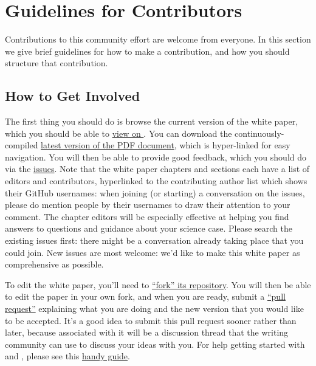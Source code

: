 \section{Guidelines for Contributors}
\def\secname{intro:guidelines}\label{sec:\secname}


Contributions to this community effort are welcome from everyone. In
this section we give brief guidelines for how to make a contribution,
and how you should structure that contribution.

\subsection{How to Get Involved}

The first thing you should do is browse the current version of the white
paper, which you should be able to \href{http://ls.st/iw2}{view on
\GitHub}. You can download the  continuously-compiled
\href{http://www.slac.stanford.edu/~digel/ObservingStrategy/whitepaper/LSST_Observing_Strategy_White_Paper.pdf}{latest
version of the PDF document}, which is hyper-linked for easy navigation.
You will then be able to provide good feedback, which you should do via
the
\href{https://github.com/LSSTScienceCollaborations/ObservingStrategy/issues}{\GitHub
issues}. Note that the white paper chapters and sections each have a
list of editors and contributors, hyperlinked to the contributing author
list which shows their GitHub usernames: when joining (or starting) a
conversation on the issues, please do {\@}mention people by
their usernames to draw their attention to your comment. The chapter
editors will be especially effective at helping you find answers to
questions and guidance about your science case. Please search the
existing issues first: there might be a
conversation already taking place that you could join. New issues are
most welcome: we'd like to make this white paper as comprehensive as
possible.

To edit the white paper, you'll need to
\href{https://help.github.com/articles/fork-a-repo/}{``fork'' its
repository}. You will then  be able to edit the paper in your own
fork, and when you are ready,  submit a
\href{https://help.github.com/articles/using-pull-requests/}{``pull
request''} explaining what you are doing and the new version that  you
would like to be accepted. It's a good idea to submit this pull
request sooner rather than later, because associated with it will be a
discussion thread that the writing community can use to discuss your
ideas with you. For help getting started with \git and \GitHub, please
see this
\href{https://github.com/drphilmarshall/GettingStarted#top}{handy
guide}.


